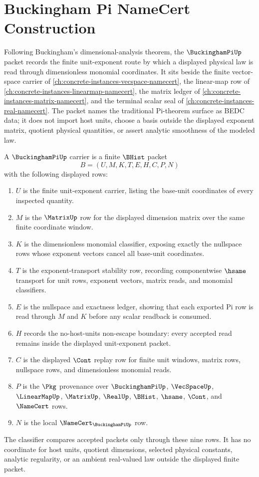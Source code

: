 \chapter{Buckingham Pi NameCert Construction}
\label{ch:concrete-instances-buckingham-pi-namecert}

Following Buckingham's dimensional-analysis theorem, the $\BuckinghamPiUp$ packet records the finite unit-exponent route by which a displayed physical law is read through dimensionless monomial coordinates. It sits beside the finite vector-space carrier of \autoref{ch:concrete-instances-vecspace-namecert}, the linear-map row of \autoref{ch:concrete-instances-linearmap-namecert}, the matrix ledger of \autoref{ch:concrete-instances-matrix-namecert}, and the terminal scalar seal of \autoref{ch:concrete-instances-real-namecert}. The packet names the traditional Pi-theorem surface as BEDC data; it does not import host units, choose a basis outside the displayed exponent matrix, quotient physical quantities, or assert analytic smoothness of the modeled law.

\begin{definition}
\label{def:buckingham-pi-carrier}
A $\BuckinghamPiUp$ carrier is a finite $\BHist$ packet
$$
B=(U,M,K,T,E,H,C,P,N)
$$
with the following displayed rows:
\begin{enumerate}
\item $U$ is the finite unit-exponent carrier, listing the base-unit coordinates of every inspected quantity.
\item $M$ is the $\MatrixUp$ row for the displayed dimension matrix over the same finite coordinate window.
\item $K$ is the dimensionless monomial classifier, exposing exactly the nullspace rows whose exponent vectors cancel all base-unit coordinates.
\item $T$ is the exponent-transport stability row, recording componentwise $\hsame$ transport for unit rows, exponent vectors, matrix reads, and monomial classifiers.
\item $E$ is the nullspace and exactness ledger, showing that each exported Pi row is read through $M$ and $K$ before any scalar readback is consumed.
\item $H$ records the no-host-units non-escape boundary: every accepted read remains inside the displayed unit-exponent packet.
\item $C$ is the displayed $\Cont$ replay row for finite unit windows, matrix rows, nullspace rows, and dimensionless monomial reads.
\item $P$ is the $\Pkg$ provenance over $\BuckinghamPiUp$, $\VecSpaceUp$, $\LinearMapUp$, $\MatrixUp$, $\RealUp$, $\BHist$, $\hsame$, $\Cont$, and $\NameCert$ rows.
\item $N$ is the local $\NameCert_{\BuckinghamPiUp}$ row.
\end{enumerate}
The classifier compares accepted packets only through these nine rows. It has no coordinate for host units, quotient dimensions, selected physical constants, analytic regularity, or an ambient real-valued law outside the displayed finite packet.
\end{definition}

